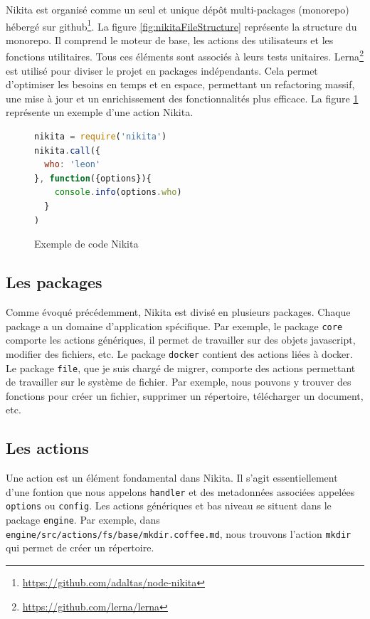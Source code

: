 \documentclass[12pt, french]{report}
\begin{document}
Nikita est organisé comme un seul et unique dépôt multi-packages (monorepo) hébergé sur \gls{github}\footnote{\href{https://github.com/adaltas/node-nikita}{https://github.com/adaltas/node-nikita}}. La figure \ref{fig:nikitaFileStructure} représente la structure du monorepo. Il comprend le moteur de base, les actions des utilisateurs et les fonctions utilitaires. Tous ces éléments sont associés à leurs tests unitaires. Lerna\footnote{\href{https://github.com/lerna/lerna}{https://github.com/lerna/lerna}} est utilisé pour diviser le projet en packages indépendants. Cela permet d'optimiser les besoins en temps et en espace, permettant un refactoring massif, une mise à jour et un enrichissement des fonctionnalités plus efficace. La figure \ref{code:example} représente un exemple d'une action Nikita.

\begin{figure}[H]
\begin{lstlisting}[language=JavaScript]
nikita = require('nikita')
nikita.call({
  who: 'leon'
}, function({options}){
    console.info(options.who)
  }
)
\end{lstlisting}
\centering
\caption{Exemple de code Nikita}
\label{code:example}
\end{figure}

\subsection{Les packages}

Comme évoqué précédemment, Nikita est divisé en plusieurs packages. Chaque package a un domaine d'application spécifique. Par exemple, le package \texttt{core} comporte les actions génériques, il permet de travailler sur des objets \gls{javascript}, modifier des fichiers, etc. Le package \texttt{docker} contient des actions liées à \gls{docker}. Le package \texttt{file}, que je suis chargé de migrer, comporte des actions permettant de travailler sur le système de fichier. Par exemple, nous pouvons y trouver des fonctions pour créer un fichier, supprimer un répertoire, télécharger un document, etc.

\subsection{Les actions}

Une action est un élément fondamental dans Nikita. Il s'agit essentiellement d'une fontion que nous appelons \texttt{handler} et des metadonnées associées appelées \texttt{options} ou \texttt{config}. Les actions génériques et bas niveau se situent dans le package \texttt{engine}. Par exemple, dans \texttt{engine/src/actions/fs/base/mkdir.coffee.md}, nous trouvons l'action \texttt{mkdir} qui permet de créer un répertoire.
\end{document}
